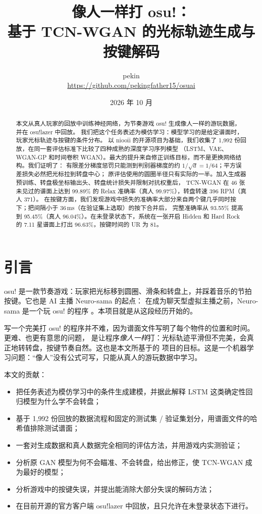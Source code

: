 \documentclass[11pt,a4paper,fontset=windows]{ctexart}
\title{像人一样打 osu!：\\基于 TCN-WGAN 的光标轨迹生成与按键解码}
\author{pekin\\\small\url{https://github.com/pekingfather15/osuai}}
\date{2026 年 10 月}
\begin{document}
\maketitle

\begin{abstract}
本文从真人玩家的回放中训练神经网络，为节奏游戏 osu! 生成像人一样的游玩数据，并在 osu!lazer 中回放。
我们把这个任务表述为模仿学习：模型学习的是给定谱面时，玩家光标轨迹与按键的条件分布。
以 niooii 的开源项目为基础，我们收集了 1{,}992 份回放，在同一套评估标准下比较了四种成熟的深度学习序列模型
（LSTM、VAE、WGAN-GP 和时间卷积 WGAN）。最大的提升来自修正训练目标，而不是更换网络结构。我们证明了：
有限差分梯度惩罚只能测到判别器梯度的约 $1/\sqrt{d}=1/64$；平方误差损失必然把光标拉到转盘中心；
原评估使用的圆圈半径只有实际的一半。加入生成器预训练、转盘极坐标输出头、转盘统计损失并限制对抗权重后，
TCN-WGAN 在 46 张未见过的谱面上达到 99.89\% 的 Relax 准确率（真人 99.97\%），转盘转速 396 RPM（真人 371）。
在按键方面，我们发现游戏中损失的准确率大部分来自两个键几乎同时按下；把间隔小于 36\,ms（在验证集上选取）的按下合并后，
完整准确率从 93.55\% 提高到 95.45\%（真人 96.04\%）。在未登录状态下，系统在一张开启 Hidden 和 Hard Rock 的
7.11 星谱面上打出 96.63\%，按键时间的 UR 为 81。
\end{abstract}

\section{引言}
osu! 是一款节奏游戏：玩家把光标移到圆圈、滑条和转盘上，并踩着音乐的节拍按键。它也是 AI 主播 Neuro-sama 的起点：
在成为聊天型虚拟主播之前，Neuro-sama 是一个玩 osu! 的程序 \citep{neurosama}。本项目就是从这段经历开始的。

写一个完美打 osu! 的程序并不难，因为谱面文件写明了每个物件的位置和时间。更难、也更有意思的问题，
是让程序\emph{像人一样}打：光标轨迹平滑但不完美，会真正地转转盘，按键节奏自然。这也是本文所基于的
\citet{niooii} 项目的目标。这是一个机器学习问题：``像人''没有公式可写，只能从真人的游玩数据中学习。

本文的贡献：
\begin{itemize}
  \item 把任务表述为模仿学习中的条件生成建模，并据此解释 LSTM 这类确定性回归模型为什么学不会转盘；
  \item 基于 1{,}992 份回放的数据流程和固定的测试集 / 验证集划分，用谱面文件的哈希值排除测试谱面；
  \item 一套对生成数据和真人数据完全相同的评估方法，并用游戏内实测验证；
  \item 分析原 GAN 模型为何不会瞄准、不会转盘，给出修正，使 TCN-WGAN 成为最好的模型；
  \item 分析游戏中的按键失误，并提出能消除大部分失误的解码方法；
  \item 在目前开源的官方客户端 osu!lazer \citep{lazer} 中回放，且只允许在未登录状态下进行。
\end{itemize}
\end{document}
